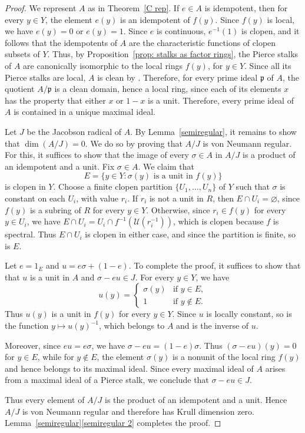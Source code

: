 \documentclass[11pt]{amsart}
\begin{document}
\begin{proof} We represent $A$ as in Theorem~\ref{C rep}. If $e\in A$ is idempotent, then for every $y\in Y$, the element $e(y)$ is an idempotent of $f(y)$. Since $f(y)$ is local, we have $e(y)=0$ or $e(y)=1$. Since $e$ is continuous, $e^{-1}(1)$ is clopen, and it  follows that the idempotents of $A$ are the characteristic functions of clopen subsets of $Y$. Thus, by Proposition~\ref{prop: stalks as factor rings}, the Pierce stalks of $A$ are canonically isomorphic to the local rings $f(y)$, for $y\in Y$. Since all its Pierce stalks are local, $A$ is clean by \cite[Proposition~1.2]{BurSte79}. Therefore, for every prime ideal $\mathfrak p$ of $A$, the quotient $A/\mathfrak p$ is a clean domain, hence a local ring, since each of its elements $x$ has the property that either $x$ or $1-x$ is a unit.
Therefore, every prime ideal of $A$ is contained in a unique maximal ideal.

Let $J$ be the Jacobson radical of $A$. By Lemma~\ref{semiregular}, it remains to show
that $\dim(A/J)=0$. We do so by proving that $A/J$ is von Neumann regular.
For this, it suffices to show that the image of every $\sigma\in A$ in $A/J$ is a product
of an idempotent and a unit.
Fix $\sigma\in A$. We claim that
$$E=\{y\in Y:\sigma(y)\text{ is a unit in }f(y)\}$$
is clopen in $Y$. Choose a finite clopen partition $\{U_1,\ldots,U_n\}$ of $Y$ such that $\sigma$ is constant on each $U_i$, with value $r_i$. If $r_i$ is not a unit in $R$, then
$E\cap U_i=\varnothing$, since $f(y)$ is a subring of $R$ for every $y\in Y$. Otherwise, since $r_i\in f(y)$ for every $y\in U_i$, we have $E\cap U_i =U_i\cap f^{-1}(\mathcal U(r_i^{-1}))$, which is clopen because $f$ is spectral. Thus $E\cap U_i$ is clopen in either case, and since the partition is finite,
so is $E$.

Let $e=1_E$ and $u=e\sigma+(1-e)$. To complete the proof, it suffices to show that that $u$ is a unit in $A$ and $\sigma-eu\in J$. 
For every $y\in Y$, we have
\[
u(y)=
\begin{cases}
\sigma(y) & \text{if }y\in E,\\
1 & \text{if }y\notin E.
\end{cases}
\]
Thus $u(y)$ is a unit in $f(y)$ for every $y\in Y$. Since $u$ is locally constant, so is the function $y\mapsto u(y)^{-1}$, which belongs to $A$ and is the inverse of $u$.

Moreover, since $eu=e\sigma$, we have $\sigma-eu=(1-e)\sigma$. Thus $(\sigma-eu)(y)=0$ for $y\in E$, while for $y\notin E$, the element $\sigma(y)$ is a nonunit of the local ring $f(y)$ and hence belongs to its maximal ideal. Since every maximal ideal of $A$ arises from a maximal ideal of a Pierce stalk,
we conclude that $\sigma-eu\in J$.

Thus every element of $A/J$ is the product of an idempotent and a unit. Hence $A/J$ is von Neumann regular and therefore has Krull dimension zero. Lemma~\ref{semiregular}\ref{semiregular 2} completes the proof.
\end{proof} 
\end{document}
